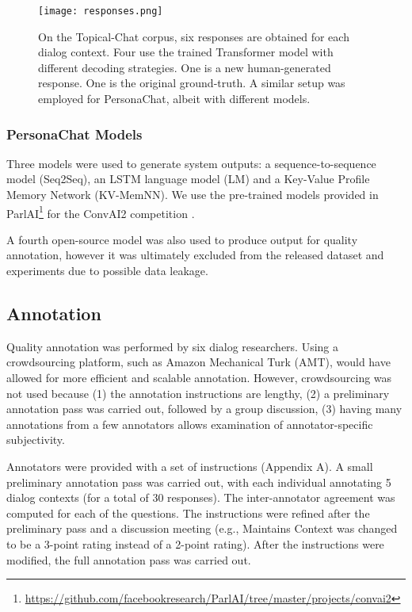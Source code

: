 \documentclass[11pt,a4paper]{article}
\begin{document}
\begin{figure}
    \centering
    \texttt{[image: responses.png]}
    \caption{On the Topical-Chat corpus, six responses are obtained for each dialog context. Four use the trained Transformer model with different decoding strategies. One is a new human-generated response. One is the original ground-truth. A similar setup was employed for PersonaChat, albeit with different models.}
    \label{fig:responses}
\end{figure}

\subsubsection{PersonaChat Models}

Three models were used to generate system outputs: a sequence-to-sequence model (Seq2Seq), an LSTM language model (LM) and a Key-Value Profile Memory Network (KV-MemNN). We use the pre-trained models provided in ParlAI\footnote{\url{https://github.com/facebookresearch/ParlAI/tree/master/projects/convai2}} for the ConvAI2 competition \citep{dinan2019second}.

A fourth open-source model was also used to produce output for quality annotation, however it was ultimately excluded from the released dataset and experiments due to possible data leakage. 

\subsection{Annotation}

Quality annotation was performed by six dialog researchers. Using a crowdsourcing platform, such as Amazon Mechanical Turk (AMT), would have allowed for more efficient and scalable annotation. However, crowdsourcing was not used because (1) the annotation instructions are lengthy, (2) a preliminary annotation pass was carried out, followed by a group discussion, (3) having many annotations from a few annotators allows examination of annotator-specific subjectivity. 

Annotators were provided with a set of instructions (Appendix A). A small preliminary annotation pass was carried out, with each individual annotating 5 dialog contexts (for a total of 30 responses). The inter-annotator agreement was computed for each of the questions. The instructions were refined after the preliminary pass and a discussion meeting (e.g., Maintains Context was changed to be a 3-point rating instead of a 2-point rating). After the instructions were modified,  the full annotation pass was carried out. 
\end{document}
